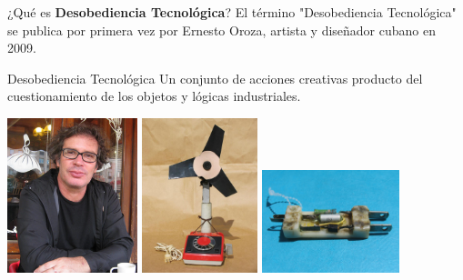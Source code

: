 \documentclass[spanish]{beamer}
\begin{document}
\begin{frame}{¿Qué es \textbf{Desobediencia Tecnológica}?}
    El término "Desobediencia Tecnológica" se publica por primera vez por Ernesto Oroza, artista y diseñador cubano en 2009.
    \begin{block}{Desobediencia Tecnológica}
        Un conjunto de acciones creativas producto del cuestionamiento de los objetos y lógicas industriales.    
    \end{block}
    \vspace{0.3cm}
    
    \centering
        \includegraphics[height=4.5cm]{img/ernestooroza.jpg}
        \includegraphics[height=4.5cm]{img/inventos/ventilador.jpg}
        \includegraphics[height=3cm]{img/inventos/battery_charger.jpg}
        
\end{frame}
\end{document}
